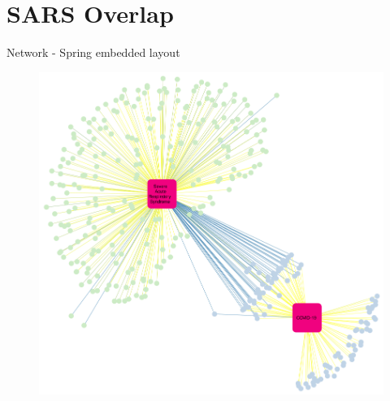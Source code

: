 \documentclass[presentation]{beamer}
\begin{document}
\section{SARS Overlap}
\begin{frame}{Network - Spring embedded layout}
    \begin{figure}
        \centering
        \includegraphics[scale=0.33]{figures/COVID19xSARS_network.png}
    \end{figure}
\end{frame}
\end{document}

